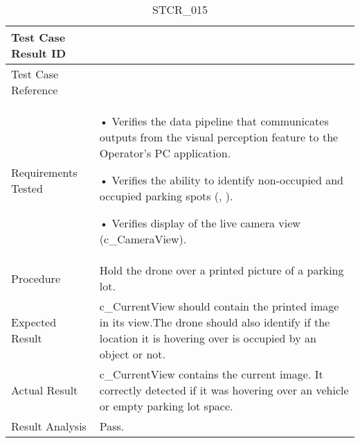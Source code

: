 \documentclass[12pt, titlepage]{article}
\begin{document}
\begin{table}[!h]
\begin{center}
\caption {STCR\_015}
\label{tab:STCR_015}
\begin{tabular}{ | m{3.2cm} | m{12.2cm} | } 
\hline
Test Case Result ID & \nameref{tab:STCR_015} \\ 
\hline
Test Case Reference & \nameref{tab:STC_015}  \\ 
\hline
Requirements Tested & • Verifies the data pipeline that communicates outputs from the visual perception feature to the Operator's PC application.

• Verifies the ability to identify non-occupied and occupied parking spots (\nameref{GEN_005}, \nameref{SR_009}).

• Verifies display of the live camera view (c\_CameraView). \\ 
\hline
Procedure & Hold the drone over a printed picture of a parking lot. \\
\hline
Expected Result & c\_CurrentView should contain the printed image in its view.The drone should also identify if the location it is hovering over is occupied by an object or not.   \\ 
\hline
Actual Result &   c\_CurrentView contains the current image. It correctly detected if it was hovering over an vehicle or empty parking lot space.  \\
\hline
Result Analysis & Pass.  \\ 
\hline
\end{tabular}
\end{center}
\end{table}
\end{document}
